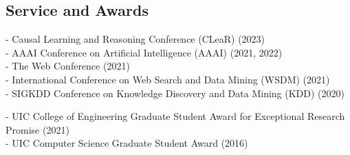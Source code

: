 \documentclass[mm]{simple_style}
\begin{document}
\begin{resume}
\vspace{-2ex}


\sectionline

\section{Service and Awards}




- Causal Learning and Reasoning Conference (CLeaR) (2023)
\\
- AAAI Conference on Artificial Intelligence (AAAI) (2021, 2022)
\\
- The Web Conference (2021)
\\
- International Conference on Web Search and Data Mining (WSDM) (2021)
\\
- SIGKDD Conference on Knowledge Discovery and Data Mining (KDD) (2020)


- UIC College of Engineering Graduate Student Award for Exceptional Research Promise (2021)
\\
- UIC Computer Science Graduate Student Award (2016)


\end{resume}
\end{document}
